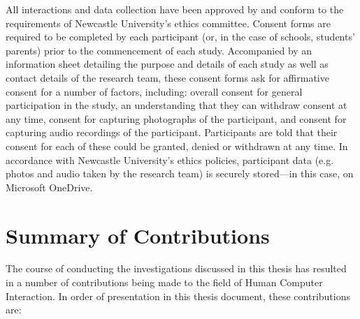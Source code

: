 All interactions and data collection have been approved by and conform to the requirements of Newcastle University’s ethics committee. Consent forms are required to be completed by each participant (or, in the case of schools, students' parents) prior to the commencement of each study. Accompanied by an information sheet detailing the purpose and details of each study as well as contact details of the research team, these consent forms ask for affirmative consent for a number of factors, including: overall consent for general participation in the study, an understanding that they can withdraw consent at any time, consent for capturing photographs of the participant, and consent for capturing audio recordings of the participant. Participants are told that their consent for each of these could be granted, denied or withdrawn at any time. In accordance with Newcastle University's ethics policies, participant data (e.g. photos and audio taken by the research team) is securely stored---in this case, on Microsoft OneDrive.

\section{Summary of Contributions}
The course of conducting the investigations discussed in this thesis has resulted in a number of contributions being made to the field of Human Computer Interaction. In order of presentation in this thesis document, these contributions are:

